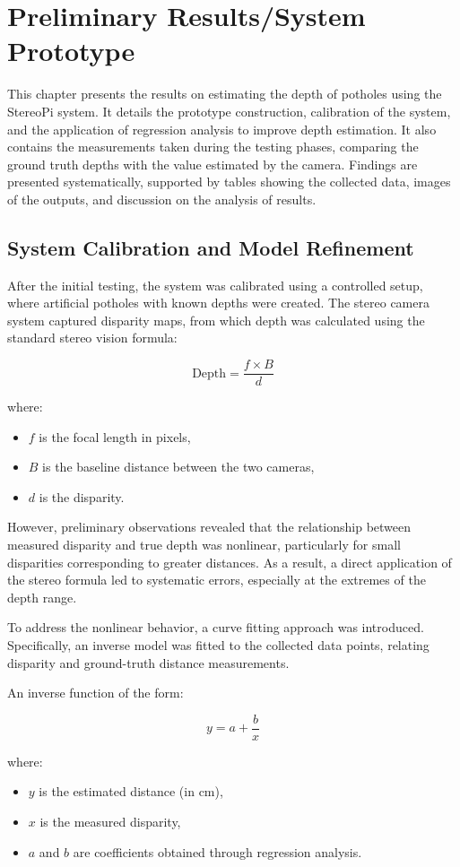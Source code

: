 \chapter{Preliminary Results/System Prototype}
This chapter presents the results on estimating the depth of potholes using the StereoPi system. It details the prototype construction, calibration of the system, and the application of regression analysis to improve depth estimation. It also contains the measurements taken during the testing phases, comparing the ground truth depths with the value estimated by the camera. Findings are presented systematically, supported by tables showing the collected data, images of the outputs, and discussion on the analysis of results.

\section{System Calibration and Model Refinement}
After the initial testing, the system was calibrated using a controlled setup, where artificial potholes with known depths were created. The stereo camera system captured disparity maps, from which depth was calculated using the standard stereo vision formula:

\[
\text{Depth} = \frac{f \times B}{d}
\]

where:
\begin{itemize}
	\item \( f \) is the focal length in pixels,
	\item \( B \) is the baseline distance between the two cameras,
	\item \( d \) is the disparity.
\end{itemize}


However, preliminary observations revealed that the relationship between measured disparity and true depth was nonlinear, particularly for small disparities corresponding to greater distances. As a result, a direct application of the stereo formula led to systematic errors, especially at the extremes of the depth range.

To address the nonlinear behavior, a curve fitting approach was introduced. Specifically, an inverse model was fitted to the collected data points, relating disparity and ground-truth distance measurements.

An inverse function of the form:

\[
y = a + \frac{b}{x}
\]

where:
\begin{itemize}
	\item \( y \) is the estimated distance (in cm),
	\item \( x \) is the measured disparity,
	\item \( a \) and \( b \) are coefficients obtained through regression analysis.
\end{itemize}

